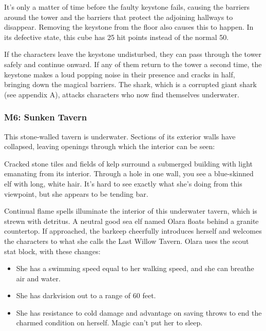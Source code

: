 \documentclass[10pt,a4paper,twoside,bg=print,twocolumn,openany,nodeprecatedcode]{dndbook}
\begin{document}
It's only a matter of time before the faulty keystone fails, causing the barriers around the tower and the barriers that protect the adjoining hallways to disappear. Removing the keystone from the floor also causes this to happen. In its defective state, this cube has 25 hit points instead of the normal 50.

If the characters leave the keystone undisturbed, they can pass through the tower safely and continue onward. If any of them return to the tower a second time, the keystone makes a loud popping noise in their presence and cracks in half, bringing down the magical barriers. The shark, which is a corrupted giant shark (see appendix A), attacks characters who now find themselves underwater.

\subsubsection{M6: Sunken Tavern}
This stone-walled tavern is underwater. Sections of its exterior walls have collapsed, leaving openings through which the interior can be seen:

\begin{DndReadAloud}{}
Cracked stone tiles and fields of kelp surround a submerged building with light emanating from its interior. Through a hole in one wall, you see a blue-skinned elf with long, white hair. It's hard to see exactly what she's doing from this viewpoint, but she appears to be tending bar.

\end{DndReadAloud}

Continual flame spells illuminate the interior of this underwater tavern, which is strewn with detritus. A neutral good sea elf named Olara floats behind a granite countertop. If approached, the barkeep cheerfully introduces herself and welcomes the characters to what she calls the Last Willow Tavern. Olara uses the scout stat block, with these changes:


\begin{itemize}
\item She has a swimming speed equal to her walking speed, and she can breathe air and water.
\item She has darkvision out to a range of 60 feet.
\item She has resistance to cold damage and advantage on saving throws to end the charmed condition on herself. Magic can't put her to sleep.
\end{itemize}
\end{document}
